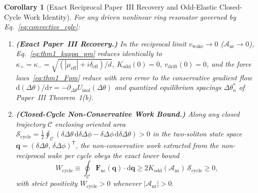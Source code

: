 \documentclass[11pt,letterpaper]{article}
\newtheorem{corollary}{Corollary}
\begin{document}
\begin{corollary}[Exact Reciprocal Paper~III Recovery and Odd-Elastic Closed-Cycle Work Identity]
\label{cor:odd_work}
For any driven nonlinear ring resonator governed by Eq.~\eqref{eq:convective_cgle}:
\begin{enumerate}
    \item[(a)] \textbf{(Exact Paper~III Recovery.)} In the reciprocal limit $v_{\mathrm{wake}} \to 0$ ($\mathcal{A}_{\mathrm{nr}} \to 0$), Eq.~\eqref{eq:thm1_kappa_pm} reduces identically to $\kappa_+ = \kappa_- = \sqrt{(|\mu_{\mathrm{eff}}| + i\delta_{\mathrm{eff}})/d}$, $K_{\mathrm{odd}}(0) = 0$, $v_{\mathrm{drift}}(0) = 0$, and the force laws~\eqref{eq:thm1_Fpm} reduce with zero error to the conservative gradient flow $\mathrm{d}(\Delta\theta)/\mathrm{d}\tau = -\partial_{\Delta\theta} U_{\mathrm{mol}}(\Delta\theta)$ and quantized equilibrium spacings $\Delta\theta_n^*$ of Paper~III Theorem~1(b).
    \item[(b)] \textbf{(Closed-Cycle Non-Conservative Work Bound.)} Along any closed trajectory $\mathcal{C}$ enclosing oriented area $\mathcal{S}_{\mathrm{cycle}} = \frac{1}{2}\oint_{\mathcal{C}}(\delta\Delta\theta\,\mathrm{d}\delta\Delta\phi - \delta\Delta\phi\,\mathrm{d}\delta\Delta\theta) > 0$ in the two-soliton state space $\mathbf{q} = (\delta\Delta\theta,\,\delta\Delta\phi)^{\mathsf{T}}$, the non-conservative work extracted from the non-reciprocal wake per cycle obeys the exact lower bound
    \begin{equation}
    W_{\mathrm{cycle}} \equiv \oint_{\mathcal{C}} \mathbf{F}_{\mathrm{nc}}(\mathbf{q})\cdot \mathrm{d}\mathbf{q} \ge 2 K_{\mathrm{odd}}(\mathcal{A}_{\mathrm{nr}})\,\mathcal{S}_{\mathrm{cycle}} \ge 0,
    \label{eq:cor1_work_identity}
    \end{equation}
    with strict positivity $W_{\mathrm{cycle}} > 0$ whenever $|\mathcal{A}_{\mathrm{nr}}| > 0$.
\end{enumerate}
\end{corollary}
\end{document}
